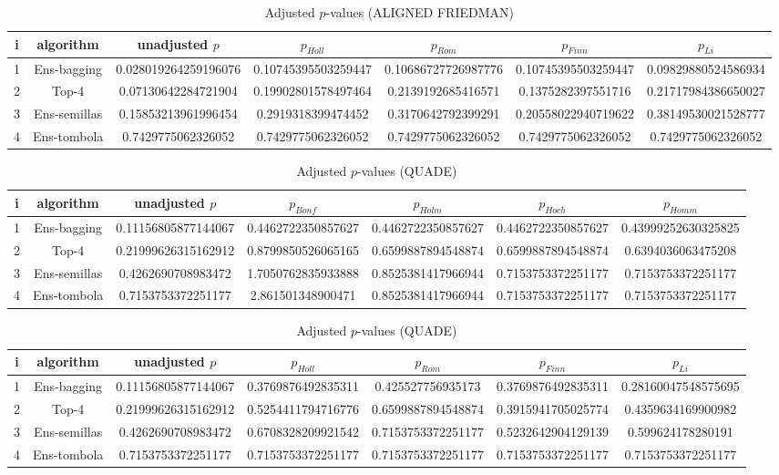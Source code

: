 \documentclass[a4paper,10pt]{article}
\begin{document}
\begin{landscape}
\begin{table}[!htp]
\centering\scriptsize
\caption{Adjusted $p$-values (ALIGNED FRIEDMAN)}
\begin{tabular}{ccccccc}
i&algorithm&unadjusted $p$&$p_{Holl}$&$p_{Rom}$&$p_{Finn}$&$p_{Li}$\\
\hline
1&Ens-bagging&0.028019264259196076&0.10745395503259447&0.10686727726987776&0.10745395503259447&0.09829880524586934\\
2&Top-4&0.07130642284721904&0.19902801578497464&0.2139192685416571&0.1375282397551716&0.21717984386650027\\
3&Ens-semillas&0.15853213961996454&0.2919318399474452&0.3170642792399291&0.20558022940719622&0.38149530021528777\\
4&Ens-tombola&0.7429775062326052&0.7429775062326052&0.7429775062326052&0.7429775062326052&0.7429775062326052\\
\hline
\end{tabular}
\end{table}


\newpage

\begin{table}[!htp]
\centering\scriptsize
\caption{Adjusted $p$-values (QUADE)}
\begin{tabular}{ccccccc}
i&algorithm&unadjusted $p$&$p_{Bonf}$&$p_{Holm}$&$p_{Hoch}$&$p_{Homm}$\\
\hline
1&Ens-bagging&0.11156805877144067&0.4462722350857627&0.4462722350857627&0.4462722350857627&0.43999252630325825\\
2&Top-4&0.21999626315162912&0.8799850526065165&0.6599887894548874&0.6599887894548874&0.6394036063475208\\
3&Ens-semillas&0.4262690708983472&1.7050762835933888&0.8525381417966944&0.7153753372251177&0.7153753372251177\\
4&Ens-tombola&0.7153753372251177&2.861501348900471&0.8525381417966944&0.7153753372251177&0.7153753372251177\\
\hline
\end{tabular}
\end{table}

\begin{table}[!htp]
\centering\scriptsize
\caption{Adjusted $p$-values (QUADE)}
\begin{tabular}{ccccccc}
i&algorithm&unadjusted $p$&$p_{Holl}$&$p_{Rom}$&$p_{Finn}$&$p_{Li}$\\
\hline
1&Ens-bagging&0.11156805877144067&0.3769876492835311&0.425527756935173&0.3769876492835311&0.28160047548575695\\
2&Top-4&0.21999626315162912&0.5254411794716776&0.6599887894548874&0.3915941705025774&0.4359634169900982\\
3&Ens-semillas&0.4262690708983472&0.6708328209921542&0.7153753372251177&0.5232642904129139&0.599624178280191\\
4&Ens-tombola&0.7153753372251177&0.7153753372251177&0.7153753372251177&0.7153753372251177&0.7153753372251177\\
\hline
\end{tabular}
\end{table}

\end{landscape}
\end{document}
